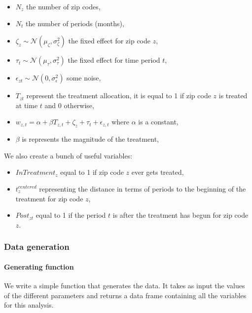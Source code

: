 \documentclass[
]{article}
\providecommand{\tightlist}{%
  \setlength{\itemsep}{0pt}\setlength{\parskip}{0pt}}
\begin{document}
\begin{itemize}
\tightlist
\item
  \(N_z\) the number of zip codes,
\item
  \(N_t\) the number of periods (months),
\item
  \(\zeta_z \sim \mathcal{N}(\mu_{\zeta}, \sigma_{\zeta}^{2})\) the
  fixed effect for zip code \(z\),
\item
  \(\tau_t \sim \mathcal{N}(\mu_{\tau}, \sigma_{\tau}^{2})\) the fixed
  effect for time period \(t\),
\item
  \(\epsilon_{zt} \sim \mathcal{N}(0, \sigma_{\epsilon}^{2})\) some
  noise,
\item
  \(T_{zt}\) represent the treatment allocation, it is equal to 1 if zip
  code \(z\) is treated at time \(t\) and 0 otherwise,
\item
  \(w_{z,t} = \alpha + \beta T_{z, t} + \zeta_z + \tau_t + \epsilon_{z,t}\)
  where \(\alpha\) is a constant,
\item
  \(\beta\) is represents the magnitude of the treatment,
\end{itemize}

We also create a bunch of useful variables:

\begin{itemize}
\tightlist
\item
  \(InTreatment_z\) equal to 1 if zip code \(z\) ever gets treated,
\item
  \(t^{centered}_z\) representing the distance in terms of periods to
  the beginning of the treatment for zip code \(z\),
\item
  \(Post_{zt}\) equal to 1 if the period \(t\) is after the treatment
  has begun for zip code \(z\).
\end{itemize}

\hypertarget{data-generation}{%
\subsubsection{Data generation}\label{data-generation}}

\hypertarget{generating-function}{%
\paragraph{Generating function}\label{generating-function}}

We write a simple function that generates the data. It takes as input
the values of the different parameters and returns a data frame
containing all the variables for this analysis.
\end{document}
